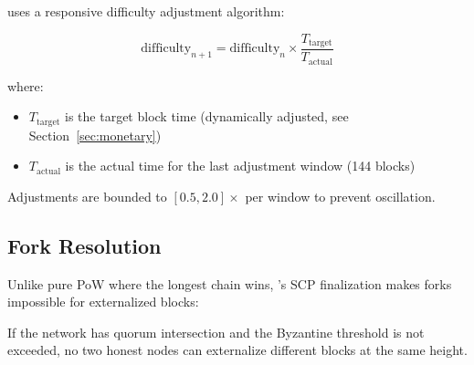 \Botho uses a responsive difficulty adjustment algorithm:

\begin{equation}
\text{difficulty}_{n+1} = \text{difficulty}_n \times \frac{T_{\text{target}}}{T_{\text{actual}}}
\end{equation}

where:
\begin{itemize}
  \item $T_{\text{target}}$ is the target block time (dynamically adjusted,
    see Section~\ref{sec:monetary})
  \item $T_{\text{actual}}$ is the actual time for the last adjustment
    window (144 blocks)
\end{itemize}

Adjustments are bounded to $[0.5, 2.0]\times$ per window to prevent
oscillation.

\subsection{Fork Resolution}

Unlike pure PoW where the longest chain wins, \Botho's SCP finalization
makes forks impossible for externalized blocks:

\begin{theorem}
\label{thm:fork-freedom}
If the network has quorum intersection and the Byzantine threshold is
not exceeded, no two honest nodes can externalize different blocks at
the same height.
\end{theorem}


